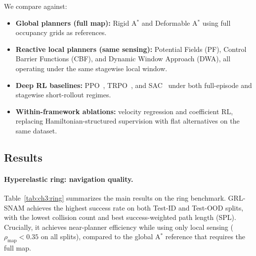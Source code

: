 We compare against:
\begin{itemize}
  \item \textbf{Global planners (full map):} Rigid A$^*$ and
        Deformable A$^*$ using full occupancy grids as references.
  \item \textbf{Reactive local planners (same sensing):} Potential
        Fields (PF), Control Barrier Functions (CBF), and Dynamic
        Window Approach (DWA), all operating under the same stagewise
        local window.
  \item \textbf{Deep RL baselines:} PPO~\citep{schulman2017proximalpolicyoptimizationalgorithms},
        TRPO~\citep{schulman2017trustregionpolicyoptimization}, and
        SAC~\citep{haarnoja2018softactorcriticoffpolicymaximum} under both full-episode and
        stagewise short-rollout regimes.
  \item \textbf{Within-framework ablations:} velocity regression and
        coefficient RL, replacing Hamiltonian-structured supervision
        with flat alternatives on the same dataset.
\end{itemize}

\subsection{Results}
\label{subsec:ch3:results}

\paragraph{Hyperelastic ring: navigation quality.}
Table~\ref{tab:ch3:ring} summarizes the main results on the ring
benchmark.
GRL-SNAM achieves the highest success rate on both Test-ID and
Test-OOD splits, with the lowest collision count and best
success-weighted path length (SPL).
Crucially, it achieves near-planner efficiency while using only local
sensing ($\rho_{\mathrm{map}} < 0.35$ on all splits), compared to the
global A$^*$ reference that requires the full map.

